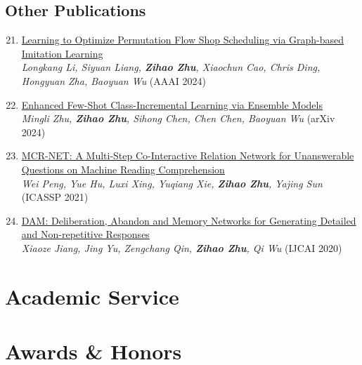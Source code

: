 \documentclass[11pt,a4paper,sans]{moderncv}
\newcommand{\darkred}[1]{\textcolor{harvardcrimson}{#1}}
\newcommand{\paperlink}[2]{\hypersetup{urlcolor=black}\href{#1}{#2}\hypersetup{urlcolor=blue}}
\begin{document}
\subsection{Other Publications}
    \begin{enumerate}[itemsep=2pt, topsep=2pt, parsep=0pt]
    \setcounter{enumi}{20}
    \item \paperlink{https://arxiv.org/pdf/2210.17178}{Learning to Optimize Permutation Flow Shop Scheduling via Graph-based Imitation Learning}\\
    \textit{Longkang Li, Siyuan Liang, \textbf{Zihao Zhu}, Xiaochun Cao, Chris Ding, Hongyuan Zha, Baoyuan Wu} \darkred{(AAAI 2024)}
    
    \item \paperlink{https://arxiv.org/pdf/2401.07208}{Enhanced Few-Shot Class-Incremental Learning via Ensemble Models}\\
    \textit{Mingli Zhu, \textbf{Zihao Zhu}, Sihong Chen, Chen Chen, Baoyuan Wu} \darkred{(arXiv 2024)}
    
    \item \paperlink{https://arxiv.org/pdf/2103.04567}{MCR-NET: A Multi-Step Co-Interactive Relation Network for Unanswerable Questions on Machine Reading Comprehension}\\
    \textit{Wei Peng, Yue Hu, Luxi Xing, Yuqiang Xie, \textbf{Zihao Zhu}, Yajing Sun} \darkred{(ICASSP 2021)}
    
    \item \paperlink{https://arxiv.org/pdf/2007.03310}{DAM: Deliberation, Abandon and Memory Networks for Generating Detailed and Non-repetitive Responses}\\
    \textit{Xiaoze Jiang, Jing Yu, Zengchang Qin, \textbf{Zihao Zhu}, Qi Wu} \darkred{(IJCAI 2020)}
    \end{enumerate}

\section{Academic Service}

\section{Awards \& Honors}
\end{document}
